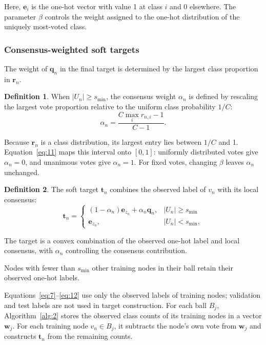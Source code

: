 \documentclass[times,review,10pt]{elsarticle}
\theoremstyle{definition}
\newtheorem{definition}{Definition}
\theoremstyle{plain}
\begin{document}
Here, \(\mathbf e_i\) is the one-hot vector with value 1 at class \(i\) and 0 elsewhere. The parameter \(\beta\) controls the weight assigned to the one-hot distribution of the uniquely most-voted class.

\subsubsection{Consensus-weighted soft targets}\label{sec:3.3.2}

The weight of \(\mathbf q_n\) in the final target is determined by the largest class proportion in \(\mathbf r_n\).

\begin{definition}
When \(|U_n|\geq s_{\min}\), the consensus weight \(\alpha_n\) is defined by rescaling the largest vote proportion relative to the uniform class probability \(1/C\):
\begin{equation}\label{eq:11}
\alpha_n=\frac{C\max_i r_{n,i}-1}{C-1}.
\end{equation}
\end{definition}

Because \(\mathbf r_n\) is a class distribution, its largest entry lies between \(1/C\) and 1. Equation~\eqref{eq:11} maps this interval onto \([0,1]\): uniformly distributed votes give \(\alpha_n=0\), and unanimous votes give \(\alpha_n=1\). For fixed votes, changing \(\beta\) leaves \(\alpha_n\) unchanged.

\begin{definition}
The soft target \(\mathbf t_n\) combines the observed label of \(v_n\) with its local consensus:
\begin{equation}\label{eq:12}
\mathbf t_n=
\begin{cases}
(1-\alpha_n)\mathbf e_{z_n}+\alpha_n\mathbf q_n,&|U_n|\geq s_{\min}\\
\mathbf e_{z_n},&|U_n|<s_{\min},
\end{cases}
\end{equation}
\end{definition}

The target is a convex combination of the observed one-hot label and local consensus, with \(\alpha_n\) controlling the consensus contribution.

Nodes with fewer than \(s_{\min}\) other training nodes in their ball retain their observed one-hot labels.

Equations~\eqref{eq:7}--\eqref{eq:12} use only the observed labels of training nodes; validation and test labels are not used in target construction. For each ball \(B_j\), Algorithm~\ref{alg:2} stores the observed class counts of its training nodes in a vector \(\mathbf w_j\). For each training node \(v_n\in B_j\), it subtracts the node's own vote from \(\mathbf w_j\) and constructs \(\mathbf t_n\) from the remaining counts.
\end{document}
